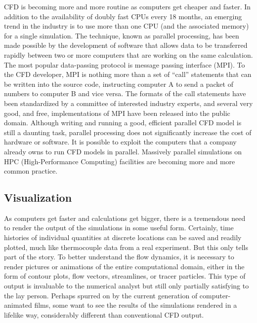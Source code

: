 \documentclass[graybox]{svmult}
\begin{document}
CFD is becoming more and more routine as computers get cheaper and faster. In addition to the availability of doubly fast CPUs every 18 months, an emerging trend in the industry is to use more than one CPU (and the associated memory) for a single simulation. The technique, known as parallel processing, has been made possible by the development of software that allows data to be transferred rapidly between two or more computers that are working on the same calculation. The most popular data-passing protocol is message passing interface (MPI). To the CFD developer, MPI is nothing more than a set of ``call'' statements that can be written into the source code, instructing computer A to send a packet of numbers to computer B and vice versa. The formats of the call statements have been standardized by a committee of interested industry experts, and several very good, and free, implementations of MPI have been released into the public domain. Although writing and running a good, efficient parallel CFD model is still a daunting task, parallel processing does not significantly increase the cost of hardware or software. It is possible to exploit the computers that a company already owns to run CFD models in parallel. Massively parallel simulations on HPC (High-Performance Computing) facilities are becoming more and more common practice.

\subsection{Visualization}

As computers get faster and calculations get bigger, there is a tremendous need to render the output of the simulations in some useful form. Certainly, time histories of individual quantities at discrete locations can be saved and readily plotted, much like thermocouple data from a real experiment. But this only tells part of the story. To better understand the flow dynamics, it is necessary to render pictures or animations of the entire computational domain, either in the form of contour plots, flow vectors, streamlines, or tracer particles. This type of output is invaluable to the numerical analyst but still only partially satisfying to the lay person. Perhaps spurred on by the current generation of computer-animated films, some want to see the results of the simulations rendered in a lifelike way, considerably different than conventional CFD output.
\end{document}
